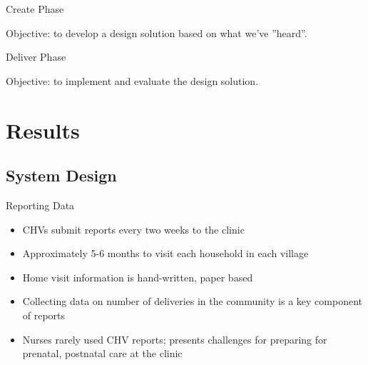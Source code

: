 \documentclass[xcolor=x11names, handout, compress]{beamer}
\renewcommand{\(}{\begin{columns}}
\renewcommand{\)}{\end{columns}}
\newcommand{\<}[1]{\begin{column}{#1}}
\renewcommand{\>}{\end{column}}
\begin{document}
\begin{frame}[t]{Create Phase}
\begin{block}{\textcolor{DodgerBlue4}{Objective: to develop a design solution based on what we've ''heard''.}}
\end{block}
\end{frame}

\begin{frame}[t]{Deliver Phase}
\begin{block}{\textcolor{DodgerBlue4}{Objective: to implement and evaluate the design solution.}}
\end{block}
\end{frame}


\section{Results}
\subsection{System Design}
\begin{frame}[t]{Reporting Data}
\begin{itemize}
\item{CHVs submit reports every two weeks to the clinic}
\item{Approximately 5-6 months to visit each household in each village}
\item{Home visit information is hand-written, paper based}
\item{Collecting data on number of deliveries in the community is a key component of reports}
\item{Nurses rarely used CHV reports; presents challenges for preparing for prenatal, postnatal care at the clinic}
\end{itemize}
\end{frame}
\end{document}

